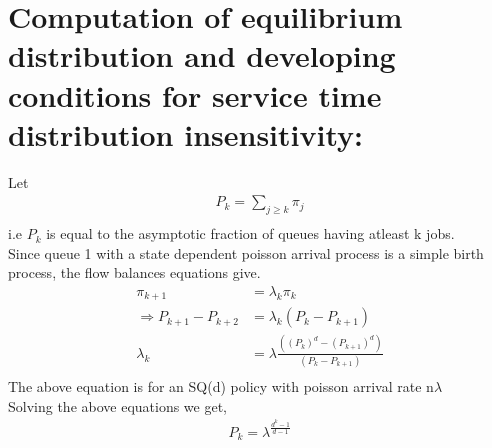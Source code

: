 \documentclass[a4paper,english,12pt]{article}
\begin{document}
\section{Computation of equilibrium distribution and developing conditions for service time distribution insensitivity:}
Let 
\begin{align*}
P_k=\sum_{j \ge k} \pi_j\\
\end{align*}
i.e $P_k$ is equal to the asymptotic fraction of queues having atleast k jobs.\\
Since queue 1 with a state dependent poisson arrival process is a simple birth process, the flow balances equations give.\\
\begin{align*}
\pi_{k+1}&=\lambda_k \pi_k\\
\Rightarrow P_{k+1}-P_{k+2}&=\lambda_k (P_k-P_{k+1})\\
\lambda_k &=\lambda \frac{((P_k)^d-(P_{k+1})^d)}{(P_k-P_{k+1})}\\
\end{align*} 
 The above equation is for an SQ(d) policy with poisson arrival rate n$\lambda$\\
 Solving the above equations we get,\\
\begin{align*}
P_k= \lambda^{\frac{d^k-1}{d-1}}
\end{align*}
\end{document}
